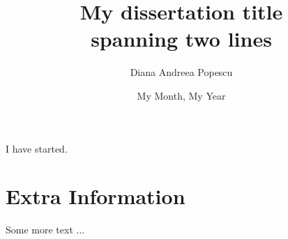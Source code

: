 \documentclass[withindex,glossary]{cam-thesis}
\title{My dissertation title\\
spanning two lines}
\author{Diana Andreea Popescu}
\date{My Month, My Year}
\begin{document}
\frontmatter{}










I have started.
\cite{example}
\cleardoublepage
{}
{}






\appendix

\chapter{Extra Information}
Some more text ...



\printthesisindex
\end{document}
